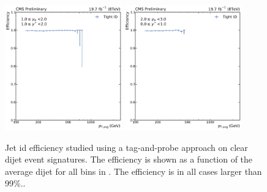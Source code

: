 \begin{figure}[htbp]
    \includegraphics[width=0.45\textwidth]{figures/measurement/jetideff_yb1ys1.pdf}\hfill
    \includegraphics[width=0.45\textwidth]{figures/measurement/jetideff_yb2ys0.pdf}
    \caption{Jet id efficiency studied using a tag-and-probe approach on clear dijet event signatures. The efficiency
    is shown as a function of the average dijet \pt for all bins in \ystar \yboost. The efficiency is in all cases larger
    than 99\%..}
    \label{fig:jetid_eff}
\end{figure}



\cleardoublepage
\listoffigures

\cleardoublepage
\listoftables

\cleardoublepage
\printglossary[type=\acronymtype]

\cleardoublepage
% 
%
%
\printbibliography

\cleardoublepage

\thispagestyle{empty}

